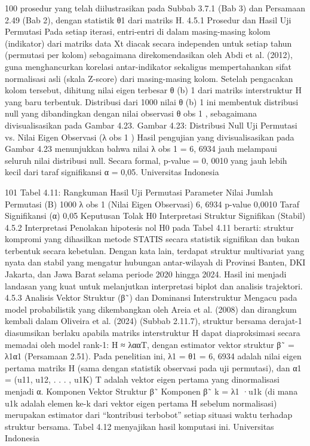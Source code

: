100
prosedur yang telah diilustrasikan pada Subbab 3.7.1 (Bab 3) dan Persamaan 2.49 (Bab 2),
dengan statistik θ1 dari matriks H.
4.5.1 Prosedur dan Hasil Uji Permutasi
Pada setiap iterasi, entri-entri di dalam masing-masing kolom (indikator) dari matriks
data Xt diacak secara independen untuk setiap tahun (permutasi per kolom) sebagaimana
direkomendasikan oleh Abdi et al. (2012), guna menghancurkan korelasi antar-indikator
sekaligus mempertahankan sifat normalisasi asli (skala Z-score) dari masing-masing
kolom. Setelah pengacakan kolom tersebut, dihitung nilai eigen terbesar θ
(b)
1 dari matriks
interstruktur H yang baru terbentuk. Distribusi dari 1000 nilai θ
(b)
1
ini membentuk distribusi
null yang dibandingkan dengan nilai observasi θ
obs
1
, sebagaimana divisualisasikan pada
Gambar 4.23.
Gambar 4.23: Distribusi Null Uji Permutasi vs. Nilai Eigen Observasi (λ
obs
1
)
Hasil pengujian yang divisualisasikan pada Gambar 4.23 menunjukkan bahwa nilai
λ
obs
1 = 6, 6934 jauh melampaui seluruh nilai distribusi null. Secara formal, p-value =
0, 0010 yang jauh lebih kecil dari taraf signifikansi α = 0,05.
Universitas Indonesia

101
Tabel 4.11: Rangkuman Hasil Uji Permutasi
Parameter Nilai
Jumlah Permutasi (B) 1000
λ
obs
1
(Nilai Eigen Observasi) 6, 6934
p-value 0,0010
Taraf Signifikansi (α) 0,05
Keputusan Tolak H0
Interpretasi Struktur Signifikan (Stabil)
4.5.2 Interpretasi
Penolakan hipotesis nol H0 pada Tabel 4.11 berarti: struktur kompromi yang dihasilkan
metode STATIS secara statistik signifikan dan bukan terbentuk secara kebetulan. Dengan
kata lain, terdapat struktur multivariat yang nyata dan stabil yang mengatur hubungan
antar-wilayah di Provinsi Banten, DKI Jakarta, dan Jawa Barat selama periode 2020 hingga
2024. Hasil ini menjadi landasan yang kuat untuk melanjutkan interpretasi biplot dan
analisis trajektori.
4.5.3 Analisis Vektor Struktur (β˜) dan Dominansi Interstruktur
Mengacu pada model probabilistik yang dikembangkan oleh Areia et al. (2008) dan
dirangkum kembali dalam Oliveira et al. (2024) (Subbab 2.11.7), struktur bersama derajat-1
diasumsikan berlaku apabila matriks interstruktur H dapat diaproksimasi secara memadai
oleh model rank-1:
H ≈ λααT,
dengan estimator vektor struktur β˜ = λ1α1 (Persamaan 2.51). Pada penelitian ini, λ1 =
θ1 = 6, 6934 adalah nilai eigen pertama matriks H (sama dengan statistik observasi
pada uji permutasi), dan α1 = (u11, u12, . . . , u1K)
T
adalah vektor eigen pertama yang
dinormalisasi menjadi α.
Komponen Vektor Struktur β˜
Komponen β˜
k = λ1 ·u1k (di mana u1k adalah elemen ke-k dari vektor eigen pertama H
sebelum normalisasi) merupakan estimator dari “kontribusi terbobot” setiap situasi waktu
terhadap struktur bersama. Tabel 4.12 menyajikan hasil komputasi ini.
Universitas Indonesia

